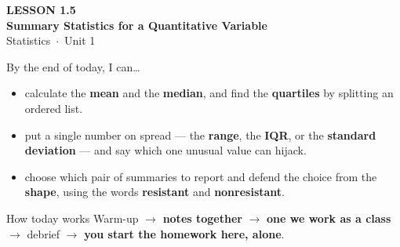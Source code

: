 \documentclass[aspectratio=169, 11pt]{beamer}
\begin{document}
{
\begin{frame}[plain]
  \vspace{2.8cm}\hspace{0.55cm}%
  \begin{minipage}{0.9\textwidth}
    {\color{goldacc}\bfseries\small LESSON 1.5}\\[0.5cm]
    {\color{white}\bfseries\LARGE Summary Statistics for a Quantitative Variable}\\[1.2cm]
    {\color{skymid}\small Statistics~$\cdot$~Unit 1}
  \end{minipage}
\end{frame}
}

\newcommand{\redink}[1]{{\color{redacc}\bfseries #1}}

\begin{frame}[t, plain]
  By the end of today, I can\ldots
  \begin{itemize}\setlength{\itemsep}{5pt}
    \item calculate the \textbf{mean} and the \textbf{median}, and find the \textbf{quartiles}
          by splitting an ordered list.
    \item put a single number on spread --- the \textbf{range}, the \textbf{IQR}, or the
          \textbf{standard deviation} --- and say which one unusual value can hijack.
    \item choose which pair of summaries to report and defend the choice from the
          \textbf{shape}, using the words \textbf{resistant} and \textbf{nonresistant}.
  \end{itemize}
  \begin{block}{How today works}
    Warm-up $\to$ \textbf{notes together} $\to$ \textbf{one we work as a class} $\to$
    debrief $\to$ \textbf{you start the homework here, alone}.
  \end{block}
\end{frame}
\end{document}

